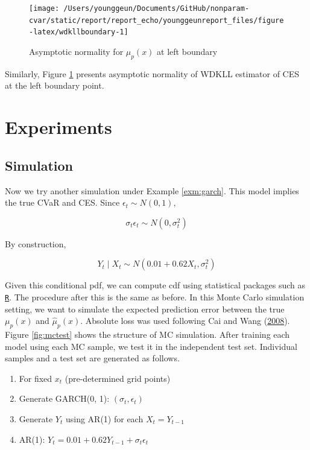 \documentclass[
]{article}
\providecommand{\tightlist}{%
  \setlength{\itemsep}{0pt}\setlength{\parskip}{0pt}}
\theoremstyle{definition}
\theoremstyle{definition}
\theoremstyle{definition}
\theoremstyle{remark}
\begin{document}
\begin{figure}[H]

{\centering \texttt{[image: /Users/younggeun/Documents/GitHub/nonparam-cvar/static/report/report\_echo/younggeunreport\_files/figure-latex/wdkllboundary-1]} 

}

\caption{Asymptotic normality for $\hat\mu_p(x)$ at left boundary}\label{fig:wdkllboundary}
\end{figure}

Similarly, Figure \ref{fig:wdkllboundary} presents asymptotic normality of WDKLL estimator of CES at the left boundary point.

\hypertarget{experiment}{%
\section{Experiments}\label{experiment}}

\hypertarget{simulation}{%
\subsection{Simulation}\label{simulation}}

Now we try another simulation under Example \ref{exm:garch}. This model implies the true CVaR and CES. Since \(\epsilon_t \sim N(0, 1)\),

\begin{equation}
  \sigma_t \epsilon_t \sim N(0, \sigma_t^2)
  \label{eq:garchterm}
\end{equation}

By construction,

\begin{equation}
  Y_t \mid X_t \sim N \left( 0.01 + 0.62 X_t, \sigma_t^2 \right)
  \label{eq:arterm}
\end{equation}

Given this conditional pdf, we can compute cdf using statistical packages such as \href{https://www.r-project.org}{\texttt{R}}. The procedure after this is the same as before. In this Monte Carlo simulation setting, we want to simulate the expected prediction error between the true \(\mu_p(x)\) and \(\hat\mu_p(x)\). Absolute loss was used following Cai and Wang (\protect\hyperlink{ref-cai:2008aa}{2008}). Figure \ref{fig:mctest} shows the structure of MC simulation. After training each model using each MC sample, we test it in the independent test set. Individual samples and a test set are generated as follows.

\begin{enumerate}
\def\labelenumi{\arabic{enumi}.}
\tightlist
\item
  For fixed \(x_t\) (pre-determined grid points)
\item
  Generate GARCH(0, 1): \((\sigma_t, \epsilon_t)\)
\item
  Generate \(Y_t\) using AR(1) for each \(X_t = Y_{t - 1}\)
\item
  AR(1): \(Y_t = 0.01 + 0.62 Y_{t - 1} + \sigma_t \epsilon_t\)
\end{enumerate}
\end{document}

